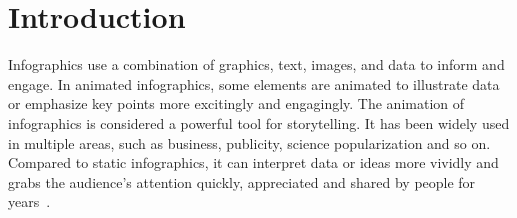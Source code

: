 \section{Introduction}
\label{sec:intro}

Infographics use a combination of graphics, text, images, and data to inform and engage.
In animated infographics, some elements are animated to illustrate data or emphasize key points more excitingly and engagingly.
The animation of infographics is considered a powerful tool for storytelling. 
It has been widely used in multiple areas, such as business, publicity, science popularization and so on. 
Compared to static infographics, it can interpret data or ideas more vividly and grabs the audience's attention quickly, appreciated and shared by people for years~\cite{blazer2019animated, brehmer2016timelines}. %


